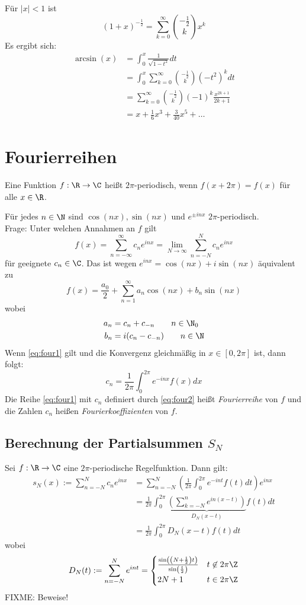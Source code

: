 \documentclass[a4paper,10pt]{scrbook}
\begin{document}
\begin{thm}
\begin{ex*}
Für $|x|<1$  ist
\[
(1+x)^{-\frac 12} = \sum_{k=0}^\infty\binom{-\frac 12}kx^k
\]
Es ergibt sich:
\begin{align*}
\arcsin(x)&=\int_0^x\frac 1{\sqrt{1-t^2}}dt\\
&=\int_0^x\sum_{k=0}^\infty\binom{-\frac 12}k(-t^2)^kdt\\
&=\sum_{k=0}^\infty\binom{-\frac 12}k(-1)^k\frac{x^{2k+1}}{2k+1}\\
&=x+\frac 16x^3+\frac 3{40}x^5+…
\end{align*}
\end{ex*}
\end{thm}

\section{Fourierreihen}

Eine Funktion $f:\R\to\C$ heißt $2\pi$-periodisch, wenn $f(x+2\pi)=f(x)$ für alle $x\in\R$.

Für jedes $n\in\N$ sind $\cos(nx), \sin(nx)$ und $e^{\pm inx}$ $2\pi$-periodisch.\\
Frage: Unter welchen Annahmen an $f$ gilt
\[
\label{eq:four1}
f(x)=\sum_{n=-\infty}^\infty c_ne^{inx}=\lim_{N\to\infty}\sum_{n=-N}^Nc_ne^{inx}
\]
für geeignete $c_n\in\C$.
Das ist wegen $e^{inx}=\cos(nx) +i\sin(nx)$ äquivalent zu
\[
f(x)=\frac{a_0}2+\sum_{n=1}^\infty a_n\cos(nx)+b_n\sin(nx)
\]
wobei
\begin{align*}
a_n&=c_n+c_{-n} \qquad n\in\N_0\\
 b_n&=i(c_n-c_{-n}) \qquad n\in\N
\end{align*}
Wenn \eqref{eq:four1} gilt und die Konvergenz gleichmäßig in $x\in[0,2\pi]$ ist, dann folgt:
\[
\label{eq:four2}
c_n=\frac 1{2\pi}\int_0^{2\pi}e^{-inx}f(x)dx
\]
Die Reihe \eqref{eq:four1} mit $c_n$ definiert durch \eqref{eq:four2} heißt \emph{Fourierreihe} von $f$ und die Zahlen $c_n$ heißen \emph{Fourierkoeffizienten} von $f$.

\subsection*{Berechnung der Partialsummen $S_N$}

Sei $f:\R\to\C$ eine $2\pi$-periodische Regelfunktion.
Dann gilt:
\begin{align*}
s_N(x):=\sum_{n=-N}^Nc_ne^{inx}
&=\sum_{n=-N}^N\left(\frac 1{2\pi}\int_0^{2\pi}e^{-int}f(t)dt\right)e^{inx}\\
&=\frac 1{2\pi}\int_0^{2\pi}\underbrace{\left(\sum_{k=-N}^ne^{in(x-t)}\right)}_{D_N(x-t)}f(t)dt\\
&=\frac 1{2\pi}\int_0^{2\pi}D_N(x-t)f(t)dt
\end{align*}
wobei
\[
D_N(t):=\sum_{n=-N}^Ne^{int}=\begin{cases}
\frac{\sin\left(\left(N+\frac 12\right)t\right)}{\sin\left(\frac t2\right)} & t\not\in 2\pi\Z\\
2N+1 & t\in 2\pi\Z
\end{cases}
\]
FIXME: Beweise!
\end{document}
